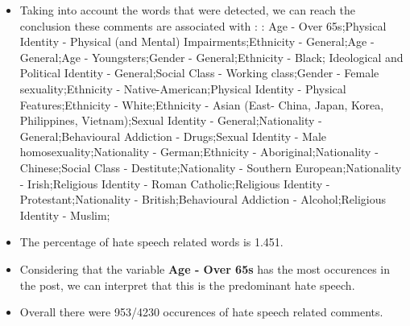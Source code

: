 \documentclass[11pt]{article}
\begin{document}
\begin{itemize}\item Taking into account the words that were detected, we can reach the conclusion these comments are associated with : : Age - Over 65s;Physical Identity - Physical (and Mental) Impairments;Ethnicity - General;Age - General;Age - Youngsters;Gender - General;Ethnicity - Black; Ideological and Political Identity - General;Social Class - Working class;Gender - Female sexuality;Ethnicity - Native-American;Physical Identity - Physical Features;Ethnicity - White;Ethnicity - Asian (East- China, Japan, Korea, Philippines, Vietnam);Sexual Identity - General;Nationality - General;Behavioural Addiction - Drugs;Sexual Identity - Male homosexuality;Nationality - German;Ethnicity - Aboriginal;Nationality - Chinese;Social Class - Destitute;Nationality - Southern European;Nationality - Irish;Religious Identity - Roman Catholic;Religious Identity - Protestant;Nationality - British;Behavioural Addiction - Alcohol;Religious Identity - Muslim;%

\item The percentage of hate speech related words is 1.451.

\item Considering that the variable \textbf{Age - Over 65s} has the most occurences in the post, we can interpret that this is the predominant hate speech.

\item Overall there were 953/4230 occurences of hate speech related comments.\end{itemize}
\end{document}
